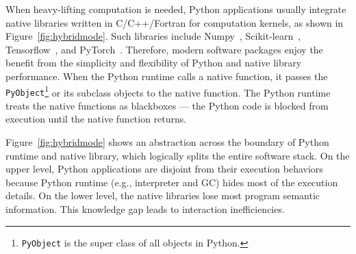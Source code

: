 
When heavy-lifting computation is needed, Python applications usually integrate native libraries written in C/C++/Fortran for computation kernels, as shown in Figure~\ref{fig:hybridmode}. Such libraries include Numpy~\cite{van2011numpy, harris2020array}, Scikit-learn~\cite{scikit-learn}, Tensorflow~\cite{tensorflow2015-whitepaper}, and PyTorch~\cite{paszke2017automatic}. Therefore, modern software packages enjoy the benefit from the simplicity and flexibility of Python and native library performance. When the Python runtime calls a native function, it passes the {\tt PyObject}\footnote{{\tt PyObject} is the super class of all objects in Python.} or its subclass objects to the native function. The Python runtime treats the native functions as blackboxes --- the Python code is blocked from execution until the native function returns.

Figure~\ref{fig:hybridmode} shows an abstraction across the boundary of Python runtime and native library, which logically splits the entire software stack. On the upper level, Python applications are disjoint from their execution behaviors because Python runtime (e.g., interpreter and GC) hides most of the execution details. On the lower level, the native libraries lose most program semantic information. This knowledge gap leads to interaction inefficiencies.


